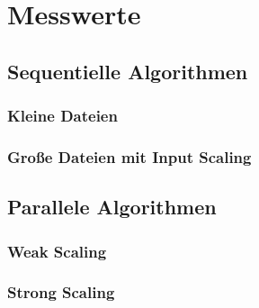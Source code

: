 \chapter{Messwerte}
\label{anhang:messwerte}
\clearpage

\section{Sequentielle Algorithmen}
\subsection{Kleine Dateien}
\label{anhang:messwerte:smallfiles}



\FloatBarrier
\subsection{Große Dateien mit Input Scaling}
\label{anhang:messwerte:inputscale}



\FloatBarrier

\section{Parallele Algorithmen}
\subsection{Weak Scaling}
\label{anhang:messwerte:weakscale}



\FloatBarrier
\subsection{Strong Scaling}
\label{anhang:messwerte:strongscale}



\FloatBarrier
